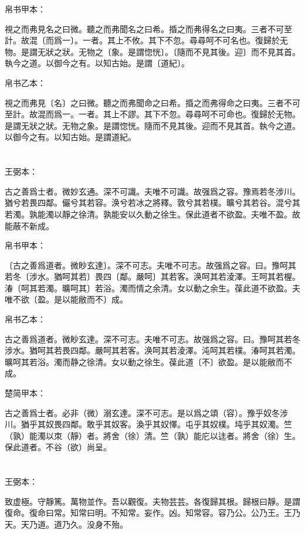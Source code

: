 \documentclass[a5paper]{ctexbook}
\begin{document}
    
    帛书甲本：

    視之而弗見名之曰微。聽之而弗聞名之曰希。捪之而弗得名之曰夷。三者不可至計。故混〔而爲一〕。一者。其上不攸。其下不忽。尋尋呵不可名也。復歸於无物。是謂无狀之狀。无物之〔象。是謂惚恍〕。〔隨而不見其後。迎〕而不見其首。執今之道。以御今之有。以知古始。是謂〔道紀〕。

    帛书乙本：

    視之而弗見〔名〕之曰微。聽之而弗聞命之曰希。捪之而弗得命之曰夷。三者不可至計。故混而爲一。一者。其上不謬。其下不忽。尋尋呵不可命也。復歸於无物。是謂无狀之狀。无物之象。是謂惚恍。隨而不見其後。迎而不見其首。執今之道。以御今之有。以知古始。是謂道紀。

    \chapter{}
    王弼本：

    古之善爲士者。微妙玄通。深不可識。夫唯不可識。故强爲之容。豫焉若冬涉川。猶兮若畏四鄰。儼兮其若容。涣兮若冰之將釋。敦兮其若樸。曠兮其若谷。混兮其若濁。孰能濁以靜之徐清。孰能安以久動之徐生。保此道者不欲盈。夫唯不盈。故能蔽不新成。

    
    帛书甲本：

    〔古之善爲道者。微眇玄達〕。深不可志。夫唯不可志。故强爲之容。曰。豫呵其若冬〔涉水。猶呵其若〕畏四〔鄰。嚴呵〕其若客。涣呵其若淩澤。王呵其若楃。湷〔呵其若濁。曠呵其〕若浴。濁而情之余清。女以動之余生。葆此道不欲盈。夫唯不欲〔盈。是以能敝而不〕成。

    帛书乙本：

    古之善爲道者。微眇玄達。深不可志。夫唯不可志。故强爲之容。曰。豫呵其若冬涉水。猶呵其若畏四鄰。嚴呵其若客。涣呵其若淩澤。沌呵其若樸。湷呵其若濁。曠呵其若浴。濁而静之徐清。女以動之徐生。葆此道〔不〕欲盈。是以能敝而不成。

    楚简甲本：

    古之善爲士者。必非（微）溺玄達。深不可志。是以爲之頌（容）。豫乎奴冬涉川。猶乎其奴畏四鄰。敢乎其奴客。渙乎其奴懌。屯乎其奴樸。坉乎其奴濁。竺（孰）能濁以朿（靜）者。將舍（徐）清。竺（孰）能庀以迬者。將舍（徐）生。保此道者。不谷（欲）尚呈。

    \chapter{}
    王弼本：

    致虚極。守靜篤。萬物並作。吾以觀復。夫物芸芸。各復歸其根。歸根曰靜。是謂復命。復命曰常。知常曰明。不知常。妄作。凶。知常容。容乃公。公乃王。王乃天。天乃道。道乃久。没身不殆。
\end{document}
